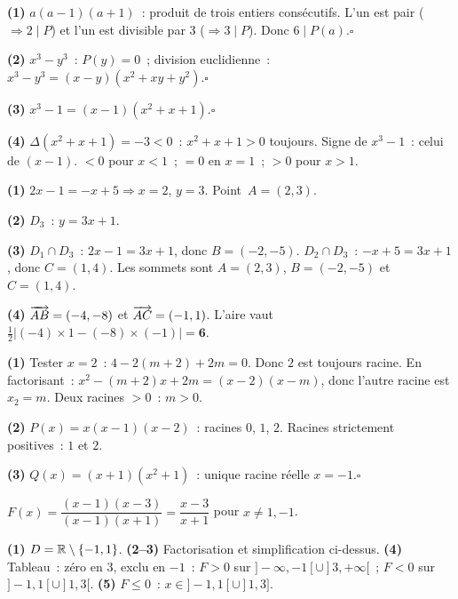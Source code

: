
\textbf{(1)} $a(a-1)(a+1)$~: produit de trois entiers cons\'ecutifs.
L'un est pair ($\Rightarrow2\mid P$) et l'un est divisible par $3$ ($\Rightarrow3\mid P$).
Donc $6\mid P(a)$.\hfill$\square$

\textbf{(2)} $x^3-y^3$~: $P(y)=0$~; division euclidienne~:
$x^3-y^3=(x-y)(x^2+xy+y^2)$.\hfill$\square$

\textbf{(3)} $x^3-1=(x-1)(x^2+x+1)$.\hfill$\square$

\textbf{(4)} $\Delta(x^2+x+1)=-3<0$~: $x^2+x+1>0$ toujours.
Signe de $x^3-1$~: celui de $(x-1)$.
$<0$ pour $x<1$~; $=0$ en $x=1$~; $>0$ pour $x>1$.


\textbf{(1)} $2x-1=-x+5\Rightarrow x=2$, $y=3$.
Point~$A=(2,3)$.

\textbf{(2)} $D_3$~: $y=3x+1$.

\textbf{(3)} $D_1\cap D_3$~: $2x-1=3x+1$, donc $B=(-2,-5)$.
$D_2\cap D_3$~: $-x+5=3x+1$, donc $C=(1,4)$.
Les sommets sont $A=(2,3)$, $B=(-2,-5)$ et $C=(1,4)$.

\textbf{(4)} $\overrightarrow{AB}=(-4,-8)$ et $\overrightarrow{AC}=(-1,1)$.
L'aire vaut $\frac12\left|(-4)\times1-(-8)\times(-1)\right|=\mathbf{6}$.


\textbf{(1)} Tester $x=2$~: $4-2(m+2)+2m=0$. Donc $2$ est toujours racine.
En factorisant~: $x^2-(m+2)x+2m=(x-2)(x-m)$, donc l'autre racine est $x_2=m$.
Deux racines $>0$~: $m>0$.

\textbf{(2)} $P(x)=x(x-1)(x-2)$~: racines $0$, $1$, $2$.
Racines strictement positives~: $1$ et $2$.

\textbf{(3)} $Q(x)=(x+1)(x^2+1)$~: unique racine r\'eelle $x=-1$.\hfill$\square$


$F(x)=\dfrac{(x-1)(x-3)}{(x-1)(x+1)}=\dfrac{x-3}{x+1}$ pour $x\ne1,-1$.

\textbf{(1)} $D=\mathbb{R}\setminus\{-1,1\}$.
\textbf{(2--3)} Factorisation et simplification ci-dessus.
\textbf{(4)} Tableau~: z\'ero en $3$, exclu en $-1$~:
$F>0$ sur $]-\infty,-1[\cup]3,+\infty[$~; $F<0$ sur $]-1,1[\cup]1,3[$.
\textbf{(5)} $F\leq0$~: $x\in]-1,1[\cup]1,3]$.

